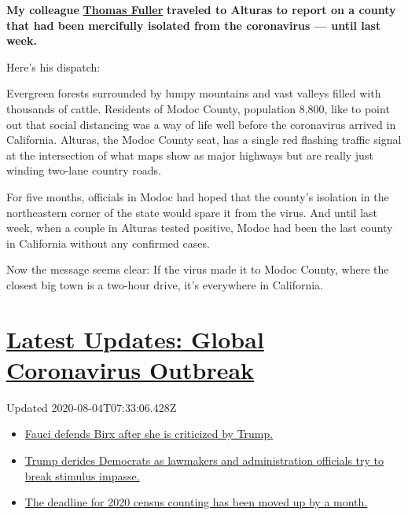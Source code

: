 \textbf{My colleague}
\textbf{\href{https://www.nytimes3xbfgragh.onion/by/thomas-fuller}{Thomas
Fuller}} \textbf{traveled to Alturas to report on a county that had been
mercifully isolated from the coronavirus --- until last week.}

Here's his dispatch:

Evergreen forests surrounded by lumpy mountains and vast valleys filled
with thousands of cattle. Residents of Modoc County, population 8,800,
like to point out that social distancing was a way of life well before
the coronavirus arrived in California. Alturas, the Modoc County seat,
has a single red flashing traffic signal at the intersection of what
maps show as major highways but are really just winding two-lane country
roads.

For five months, officials in Modoc had hoped that the county's
isolation in the northeastern corner of the state would spare it from
the virus. And until last week, when a couple in Alturas tested
positive, Modoc had been the last county in California without any
confirmed cases.

Now the message seems clear: If the virus made it to Modoc County, where
the closest big town is a two-hour drive, it's everywhere in California.

\hypertarget{latest-updates-global-coronavirus-outbreak}{%
\section{\texorpdfstring{\href{https://www.nytimes3xbfgragh.onion/2020/08/03/world/coronavirus-covid-19.html?action=click\&pgtype=Article\&state=default\&region=MAIN_CONTENT_1\&context=storylines_live_updates}{Latest
Updates: Global Coronavirus
Outbreak}}{Latest Updates: Global Coronavirus Outbreak}}\label{latest-updates-global-coronavirus-outbreak}}

Updated 2020-08-04T07:33:06.428Z

\begin{itemize}
\tightlist
\item
  \href{https://www.nytimes3xbfgragh.onion/2020/08/03/world/coronavirus-covid-19.html?action=click\&pgtype=Article\&state=default\&region=MAIN_CONTENT_1\&context=storylines_live_updates\#link-4547638f}{Fauci
  defends Birx after she is criticized by Trump.}
\item
  \href{https://www.nytimes3xbfgragh.onion/2020/08/03/world/coronavirus-covid-19.html?action=click\&pgtype=Article\&state=default\&region=MAIN_CONTENT_1\&context=storylines_live_updates\#link-15e7f995}{Trump
  derides Democrats as lawmakers and administration officials try to
  break stimulus impasse.}
\item
  \href{https://www.nytimes3xbfgragh.onion/2020/08/03/world/coronavirus-covid-19.html?action=click\&pgtype=Article\&state=default\&region=MAIN_CONTENT_1\&context=storylines_live_updates\#link-e5a2cda}{The
  deadline for 2020 census counting has been moved up by a month.}
\end{itemize}

